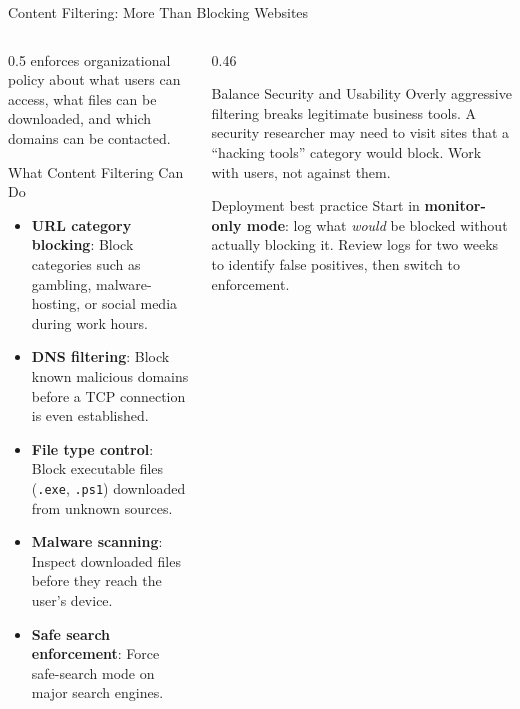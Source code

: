 \documentclass[aspectratio=169]{beamer}  %
\begin{document}
\begin{frame}{Content Filtering: More Than Blocking Websites}
    \begin{columns}[T]
        \begin{column}{0.5\textwidth}
            \footnotesize
             enforces organizational policy about what users can access, what files can be downloaded, and which domains can be contacted.

            \begin{block}{What Content Filtering Can Do}
                \footnotesize
                \begin{itemize}
                    \item \textbf{URL category blocking}: Block categories such as gambling, malware-hosting, or social media during work hours.
                    \item \textbf{DNS filtering}: Block known malicious domains before a TCP connection is even established.
                    \item \textbf{File type control}: Block executable files (\texttt{.exe}, \texttt{.ps1}) downloaded from unknown sources.
                    \item \textbf{Malware scanning}: Inspect downloaded files before they reach the user's device.
                    \item \textbf{Safe search enforcement}: Force safe-search mode on major search engines.
                \end{itemize}
            \end{block}
        \end{column}
        \begin{column}{0.46\textwidth}
            \begin{alertblock}{Balance Security and Usability}
                \footnotesize
                Overly aggressive filtering breaks legitimate business tools. A security researcher may need to visit sites that a ``hacking tools'' category would block. Work with users, not against them.
            \end{alertblock}
            \begin{exampleblock}{Deployment best practice}
                \footnotesize
                Start in \textbf{monitor-only mode}: log what \emph{would} be blocked without actually blocking it. Review logs for two weeks to identify false positives, then switch to enforcement.
            \end{exampleblock}
        \end{column}
    \end{columns}
\end{frame}
\end{document}
